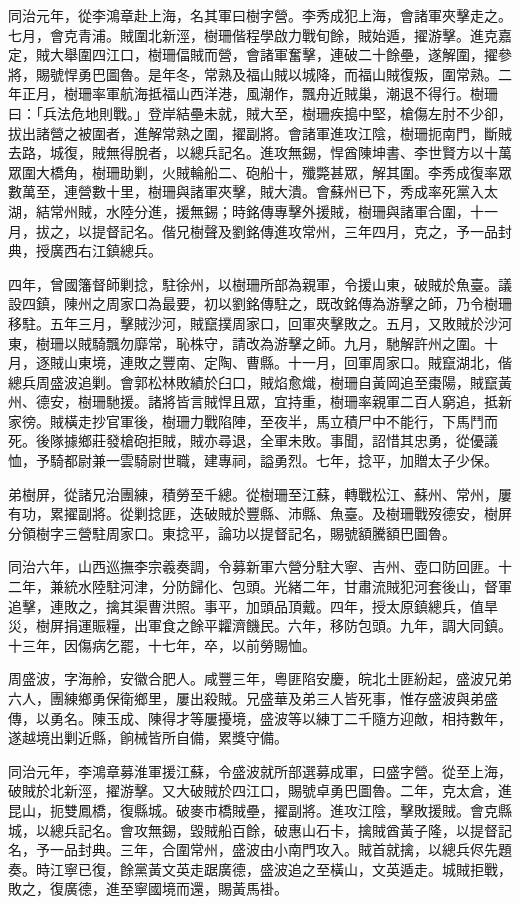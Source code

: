 \begin{pinyinscope}
同治元年，從李鴻章赴上海，名其軍曰樹字營。李秀成犯上海，會諸軍夾擊走之。七月，會克青浦。賊圍北新涇，樹珊偕程學啟力戰旬餘，賊始遁，擢游擊。進克嘉定，賊大舉圍四江口，樹珊偪賊而營，會諸軍奮擊，連破二十餘壘，遂解圍，擢參將，賜號悍勇巴圖魯。是年冬，常熟及福山賊以城降，而福山賊復叛，圍常熟。二年正月，樹珊率軍航海抵福山西洋港，風潮作，飄舟近賊巢，潮退不得行。樹珊曰：「兵法危地則戰。」登岸結壘未就，賊大至，樹珊疾搗中堅，槍傷左肘不少卻，拔出諸營之被圍者，進解常熟之圍，擢副將。會諸軍進攻江陰，樹珊扼南門，斷賊去路，城復，賊無得脫者，以總兵記名。進攻無錫，悍酋陳坤書、李世賢方以十萬眾圍大橋角，樹珊助剿，火賊輪船二、砲船十，殲斃甚眾，解其圍。李秀成復率眾數萬至，連營數十里，樹珊與諸軍夾擊，賊大潰。會蘇州已下，秀成率死黨入太湖，結常州賊，水陸分進，援無錫；時銘傳專擊外援賊，樹珊與諸軍合圍，十一月，拔之，以提督記名。偕兄樹聲及劉銘傳進攻常州，三年四月，克之，予一品封典，授廣西右江鎮總兵。

四年，曾國籓督師剿捻，駐徐州，以樹珊所部為親軍，令援山東，破賊於魚臺。議設四鎮，陳州之周家口為最要，初以劉銘傳駐之，既改銘傳為游擊之師，乃令樹珊移駐。五年三月，擊賊沙河，賊竄撲周家口，回軍夾擊敗之。五月，又敗賊於沙河東，樹珊以賊騎飄勿靡常，恥株守，請改為游擊之師。九月，馳解許州之圍。十月，逐賊山東境，連敗之豐南、定陶、曹縣。十一月，回軍周家口。賊竄湖北，偕總兵周盛波追剿。會郭松林敗績於臼口，賊焰愈熾，樹珊自黃岡追至棗陽，賊竄黃州、德安，樹珊馳援。諸將皆言賊悍且眾，宜持重，樹珊率親軍二百人窮追，抵新家徬。賊橫走抄官軍後，樹珊力戰陷陣，至夜半，馬立積尸中不能行，下馬鬥而死。後隊據鄉莊發槍砲拒賊，賊亦尋退，全軍未敗。事聞，詔惜其忠勇，從優議恤，予騎都尉兼一雲騎尉世職，建專祠，謚勇烈。七年，捻平，加贈太子少保。

弟樹屏，從諸兄治團練，積勞至千總。從樹珊至江蘇，轉戰松江、蘇州、常州，屢有功，累擢副將。從剿捻匪，迭破賊於豐縣、沛縣、魚臺。及樹珊戰歿德安，樹屏分領樹字三營駐周家口。東捻平，論功以提督記名，賜號額騰額巴圖魯。

同治六年，山西巡撫李宗羲奏調，令募新軍六營分駐大寧、吉州、壺口防回匪。十二年，兼統水陸駐河津，分防歸化、包頭。光緒二年，甘肅流賊犯河套後山，督軍追擊，連敗之，擒其渠曹洪照。事平，加頭品頂戴。四年，授太原鎮總兵，值旱災，樹屏捐運賑糧，出軍食之餘平糶濟饑民。六年，移防包頭。九年，調大同鎮。十三年，因傷病乞罷，十七年，卒，以前勞賜恤。

周盛波，字海舲，安徽合肥人。咸豐三年，粵匪陷安慶，皖北土匪紛起，盛波兄弟六人，團練鄉勇保衛鄉里，屢出殺賊。兄盛華及弟三人皆死事，惟存盛波與弟盛傳，以勇名。陳玉成、陳得才等屢擾境，盛波等以練丁二千隨方迎敵，相持數年，遂越境出剿近縣，餉械皆所自備，累獎守備。

同治元年，李鴻章募淮軍援江蘇，令盛波就所部選募成軍，曰盛字營。從至上海，破賊於北新涇，擢游擊。又大破賊於四江口，賜號卓勇巴圖魯。二年，克太倉，進昆山，扼雙鳳橋，復縣城。破麥市橋賊壘，擢副將。進攻江陰，擊敗援賊。會克縣城，以總兵記名。會攻無錫，毀賊船百餘，破惠山石卡，擒賊酋黃子隆，以提督記名，予一品封典。三年，合圍常州，盛波由小南門攻入。賊首就擒，以總兵侭先題奏。時江寧已復，餘黨黃文英走踞廣德，盛波追之至橫山，文英遁走。城賊拒戰，敗之，復廣德，進至寧國境而還，賜黃馬褂。


\end{pinyinscope}
